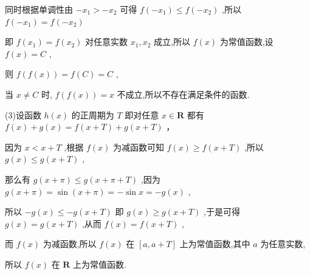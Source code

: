 \documentclass[10pt]{article}
\begin{document}
同时根据单调性由 \(- {x}_{1} >  - {x}_{2}\) 可得 \(f\left( {-{x}_{1}}\right)  \leq  f\left( {-{x}_{2}}\right)\) ,所以 \(f\left( {-{x}_{1}}\right)  = f\left( {-{x}_{2}}\right)\)

即 \(f\left( {x}_{1}\right)  = f\left( {x}_{2}\right)\) 对任意实数 \({x}_{1},{x}_{2}\) 成立,所以 \(f\left( x\right)\) 为常值函数,设 \(f\left( x\right)  = C\) ,

则 \(f\left( {f\left( x\right) }\right)  = f\left( C\right)  = C\) ,

当 \(x \neq  C\) 时, \(f\left( {f\left( x\right) }\right)  = x\) 不成立,所以不存在满足条件的函数.

(3)设函数 \(h\left( x\right)\) 的正周期为 \(T\) 即对任意 \(x \in  \mathbf{R}\) 都有 \(f\left( x\right)  + g\left( x\right)  = f\left( {x + T}\right)  + g\left( {x + T}\right)\) ，

因为 \(x < x + T\) ,根据 \(f\left( x\right)\) 为减函数可知 \(f\left( x\right)  \geq  f\left( {x + T}\right)\) ,所以 \(g\left( x\right)  \leq  g\left( {x + T}\right)\) ,

那么有 \(g\left( {x + \pi }\right)  \leq  g\left( {x + \pi  + T}\right)\) ,因为 \(g\left( {x + \pi }\right)  = \sin \left( {x + \pi }\right)  =  - \sin x =  - g\left( x\right)\) ,

所以 \(- g\left( x\right)  \leq   - g\left( {x + T}\right)\) 即 \(g\left( x\right)  \geq  g\left( {x + T}\right)\) ,于是可得 \(g\left( x\right)  = g\left( {x + T}\right)\) ,从而 \(f\left( x\right)  = f\left( {x + T}\right)\) ,

而 \(f\left( x\right)\) 为减函数,所以 \(f\left( x\right)\) 在 \(\left\lbrack  {a,a + T}\right\rbrack\) 上为常值函数,其中 \(a\) 为任意实数,

所以 \(f\left( x\right)\) 在 \(\mathbf{R}\) 上为常值函数.
\end{document}

